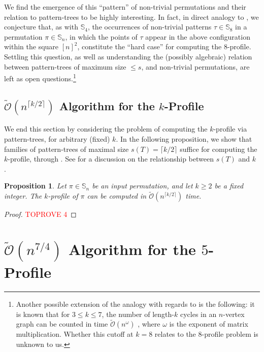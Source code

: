 \documentclass{article}
\newtheorem{proposition}[theorem]{Proposition}
\newcommand{\Sn}{\mathbb{S}_n}
\theoremstyle{remark}
\newcommand{\Otilde}[1]{\widetilde{\mathcal{O}}\left( #1 \right)}
\theoremstyle{plain}
\begin{document}
We find the emergence of this ``pattern'' of non-trivial permutations and their relation to pattern-trees
to be highly interesting. In fact, in direct analogy to \cite{dudek2020counting},
we conjecture that, as with $\mathbb{S}_4$, 
the occurrences of non-trivial patterns $\tau \in \mathbb{S}_8$ in a permutation $\pi \in \mathbb{S}_n$,
in which the points of $\tau$
appear in the above configuration within the square $[n]^2$,
constitute the ``hard case'' for computing the $8$-profile.
Settling this question, as well as understanding the (possibly algebraic) relation between pattern-trees
of maximum size $\le s$, and non-trivial permutations, are left as open questions.\footnote{
Another possible extension of the analogy with regards to \cite{dudek2020counting} is the following: 
it is known that for $3 \le k \le 7$, the number of length-$k$ cycles in an $n$-vertex graph can be counted
in time $\Otilde{n^\omega}$ \cite{alon1997finding}, where $\omega$ is the exponent of matrix multiplication.
Whether this cutoff at $k=8$ relates to the $8$-profile problem is unknown to us.
}

\subsection{\texorpdfstring{$\Otilde{n^{\lceil k / 2 \rceil}}$}{O(nk/2)} Algorithm for the \texorpdfstring{$k$}{k}-Profile}
\label{subsect:k_over_2_alg}

We end this section by considering the problem of computing the $k$-profile via pattern-trees, for arbitrary (fixed) $k$.
In the following proposition, we show that families of pattern-trees of maximal size $s(T)=\lceil k / 2 \rceil$
suffice for computing the $k$-profile, through .
See  for a discussion on the relationship between $s(T)$ and $k$.\

\begin{proposition}
    \label{prop:k_over_2_family}
    Let $\pi \in \Sn$ be an input permutation, and let $k\ge 2$ be a fixed integer. The $k$-profile of $\pi$ can be computed in $\Otilde{n^{\lceil k / 2 \rceil}}$ time.
\end{proposition}
\begin{proof}\textcolor{red}{TOPROVE 4}\end{proof}
 \section{\texorpdfstring{$\Otilde{n^{7/4}}$}{O(n 7/4)} Algorithm for the \texorpdfstring{$5$}{5}-Profile}
\label{sect:5_prof_alg}
\end{document}
